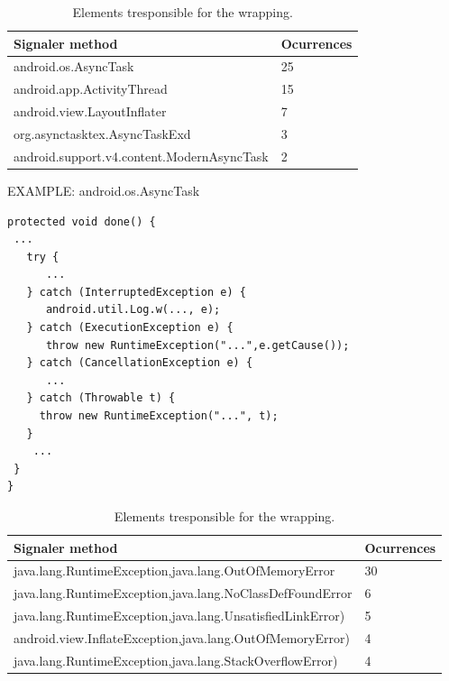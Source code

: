 \documentclass[conference]{IEEEtran}
\begin{document}
\begin{table}
\centering
\begin{tabular}{ll}
 \bfseries{Signaler method} & \bfseries{Ocurrences} \\
    \hline
android.os.AsyncTask &	25 \\
android.app.ActivityThread & 15 \\
android.view.LayoutInflater & 7 \\
org.asynctasktex.AsyncTaskExd & 3 \\
android.support.v4.content.ModernAsyncTask & 2\\
\hline
  \end{tabular}
\caption{Elements tresponsible for the wrapping.}
\label{tab:wrapping01}
\end{table}


EXAMPLE: android.os.AsyncTask

{\footnotesize
\begin{verbatim}
protected void done() {
 ...
   try {
      ...
   } catch (InterruptedException e) {
      android.util.Log.w(..., e);
   } catch (ExecutionException e) {
      throw new RuntimeException("...",e.getCause());
   } catch (CancellationException e) {
      ...
   } catch (Throwable t) {
     throw new RuntimeException("...", t);
   }
    ...
 }
}
\end{verbatim}
}




\begin{table}
\centering
\begin{tabular}{ll}
 \bfseries{Signaler method} & \bfseries{Ocurrences} \\
    \hline
java.lang.RuntimeException,java.lang.OutOfMemoryError & 30\\
java.lang.RuntimeException,java.lang.NoClassDefFoundError & 6\\
java.lang.RuntimeException,java.lang.UnsatisfiedLinkError) & 5\\
android.view.InflateException,java.lang.OutOfMemoryError) & 4\\
java.lang.RuntimeException,java.lang.StackOverflowError)  & 4\\
\hline
  \end{tabular}
\caption{Elements tresponsible for the wrapping.}
\label{tab:wrapping01}
\end{table}
\end{document}
